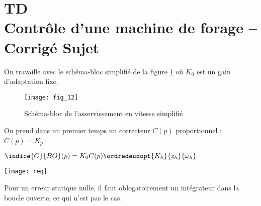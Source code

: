 \chapter*{TD  \\ 
Contrôle d'une machine de forage -- 
\ifprof Corrigé \else Sujet \fi}

\iflivret {} \else
\ifprof  {} \else \fi
\fi

\setcounter{question}{0}




\ifprof
\else
On travaille avec le schéma-bloc simplifié de la figure \ref{Cy_02_Ch_04_TD_03_fig_12} où $K_0$ est un gain d’adaptation fixe. 


\begin{figure}[!h]
\texttt{[image: fig\_12]}
\caption{Schéma-bloc de l’asservissement en vitesse simplifié \label{Cy_02_Ch_04_TD_03_fig_12}}
\end{figure}

 On prend dans un premier temps un correcteur $C(p)$ proportionnel : $C(p) = K_p$. 
 \fi
 
\ifprof
\begin{corrige}

$\indice{G}{BO}(p) = K_0 C(p) \ordredeuxopt{K_h}{z_h}{\omega_h}$
 
\end{corrige}

\else
\fi


\begin{marginfigure}
\texttt{[image: req]}
\end{marginfigure}

\ifprof
\begin{corrige}
Pour un erreur statique nulle, il faut oblogatoirement un intégrateur dans la boucle ouverte, ce qui n'est pas le cas. 
\end{corrige}
\else
\fi


